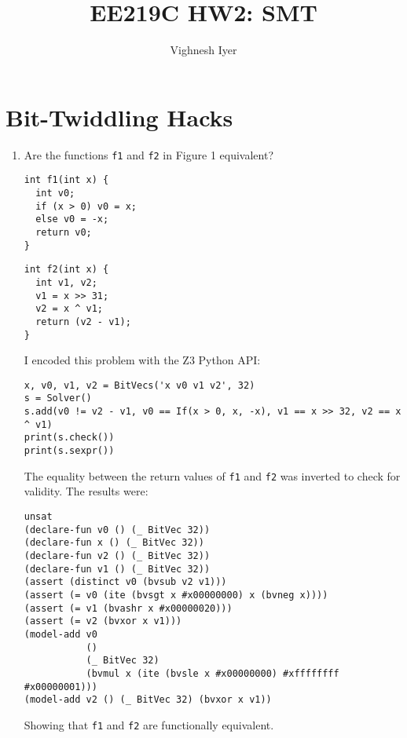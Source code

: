 

\title{EE219C HW2: SMT}
\author{Vighnesh Iyer}
\date{}
\maketitle

\section{Bit-Twiddling Hacks}
\begin{enumerate}[label=(\alph*)]
  \item {\color{blue}Are the functions \texttt{f1} and \texttt{f2} in Figure 1 equivalent?}

    \bigskip
    \noindent
    \begin{minipage}[c]{0.4\textwidth}
        \begin{verbatim}
int f1(int x) {
  int v0;
  if (x > 0) v0 = x;
  else v0 = -x;
  return v0;
}
      \end{verbatim}
    \end{minipage}
    \hfill
    \begin{minipage}[c]{0.4\textwidth}
        \begin{verbatim}
int f2(int x) {
  int v1, v2;
  v1 = x >> 31;
  v2 = x ^ v1;
  return (v2 - v1);
}
      \end{verbatim}
    \end{minipage}
    \bigskip

    I encoded this problem with the Z3 Python API:
    \begin{verbatim}
x, v0, v1, v2 = BitVecs('x v0 v1 v2', 32)
s = Solver()
s.add(v0 != v2 - v1, v0 == If(x > 0, x, -x), v1 == x >> 32, v2 == x ^ v1)
print(s.check())
print(s.sexpr())
    \end{verbatim}

    The equality between the return values of \texttt{f1} and \texttt{f2} was inverted to check for validity. The results were:
    \begin{verbatim}
unsat
(declare-fun v0 () (_ BitVec 32))
(declare-fun x () (_ BitVec 32))
(declare-fun v2 () (_ BitVec 32))
(declare-fun v1 () (_ BitVec 32))
(assert (distinct v0 (bvsub v2 v1)))
(assert (= v0 (ite (bvsgt x #x00000000) x (bvneg x))))
(assert (= v1 (bvashr x #x00000020)))
(assert (= v2 (bvxor x v1)))
(model-add v0
           ()
           (_ BitVec 32)
           (bvmul x (ite (bvsle x #x00000000) #xffffffff #x00000001)))
(model-add v2 () (_ BitVec 32) (bvxor x v1))
    \end{verbatim}

    Showing that \texttt{f1} and \texttt{f2} are functionally equivalent.
\end{enumerate}

